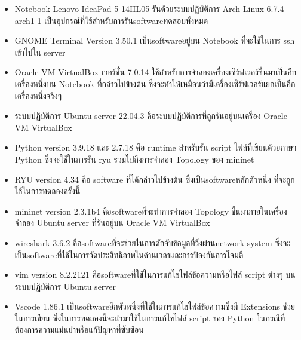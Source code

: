 \begin{itemize}
    \item Notebook Lenovo IdeaPad 5 14IIL05 รันด้วยระบบปฏิบัติการ Arch Linux 6.7.4-arch1-1 
    \hspace{1em}เป็นอุปกรณ์ที่ใช้สำหรับการรัน\gls{software}ทดสอบทั้งหมด
    \item GNOME Terminal Version 3.50.1 \hspace{1em}
    เป็น\gls{software}อยู่บน Notebook ที่จะใช้ในการ ssh เข้าไปใน server 
    \item Oracle VM VirtualBox เวอร์ชั่น 7.0.14\hspace{1em} 
    ใช้สำหรับการจำลองเครื่องเซิร์ฟเวอร์ขึ้นมาเป็นอีกเครื่องหนึ่งบน Notebook
     ที่กล่าวไปข้างต้น ซึ่งจะทำให้เหมือนว่ามีเครื่องเซิร์ฟเวอร์แยกเป็นอีกเครื่องหนึ่งจริงๆ
    \item ระบบปฏิบัติการ Ubuntu server 22.04.3\hspace{1em}
    คือระบบปฏิบัติการที่ถูกรันอยู่บนเครื่อง Oracle VM VirtualBox 
    \item Python version 3.9.18 และ 2.7.18 \hspace{1em}
    คือ runtime สำหรับรัน script ไฟล์ที่เขียนด้วยภาษา Python ซึ่งจะใช้ในการรัน \gls{ryu} รวมไปถึงการจำลอง Topology ของ mininet
    \item RYU version 4.34\hspace{1em}
    คือ \gls{software} ที่ได้กล่าวไปข้างต้น ซึ่งเป็น\gls{software}หลักตัวหนึ่ง ที่จะถูกใช้ในการทดลองครั้งนี้
    \item mininet version 2.3.1b4\hspace{1em}
    คือ\gls{software}ที่จะทำการจำลอง Topology ขึ้นมาภายในเครื่องจำลอง Ubuntu server ที่รันอยู่บน Oracle VM VirtualBox
    \item wireshark 3.6.2 \hspace{1em}
    คือ\gls{software}ที่จะช่วยในการดักจับข้อมูลที่วิ่งผ่าน\gls{network-system} ซึ่งจะเป็น\gls{software}ที่ใช้ในการวัดประสิทธิภาพในด้านเวลาและการป้องกันการโจมตี
    \item vim version 8.2.2121\hspace{1em}
    คือ\gls{software}ที่ใช้ในการแก้ไขไฟล์ข้อความหรือไฟล์ script ต่างๆ บนระบบปฏิบัติการ Ubuntu server
    \item Vscode 1.86.1\hspace{1em}
    เป็น\gls{software}อีกตัวหนึ่งที่ใช้ในการแก้ไขไฟล์ข้อความซึ่งมี Extensions ช่วยในการเขียน ซึ่งในการทดลองนี้จะนำมาใช้ในการแก้ไขไฟล์ script ของ Python ในกรณีที่ต้องการความแม่นยำหรือแก้ปัญหาที่ซับซ้อน
\end{itemize}

